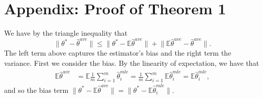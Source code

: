 \documentclass[twoside]{article}
\newcommand{\E}{\mathbb{E}}
\newcommand{\w}{\theta}
\newcommand{\wave}{\hat\w^{ave}}
\newcommand{\wmle}{\hat\w^{mle}}
\newcommand{\wstar}{{\w^{*}}}
\newcommand{\ltwo}[1]{{\lVert {#1} \rVert}}
\begin{document}


\clearpage




\clearpage

\section*{Appendix: Proof of Theorem 1}
We have by the triangle inequality that
\begin{equation}
\ltwo{\wstar-\wave} \le \ltwo{\wstar-\E\wave} + \ltwo{\E\wave-\wave}
.
\label{eq:biasvar}
\end{equation}
The left term above captures the estimator's bias and the right term the variance.
First we consider the bias.
By the linearity of expectation, we have that
\begin{align}
\E\wave
&=
\E\frac{1}{m}\sum_{i=1}^m\wmle_i
=
\frac{1}{m}\sum_{i=1}^m\E\wmle_i
=
\E\wmle_i
,
\label{eq:expwave}
\end{align}
and so the bias term
$\ltwo{\wstar-\E\wave}
=
\ltwo{\wstar-\E\wmle_i}
$.
\end{document}
